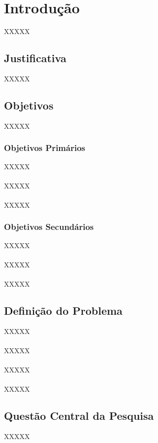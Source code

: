 \chapter{Introdução}
\label{Cap:Intro}


XXXXX

\section{Justificativa}

XXXXX

\section{Objetivos}

XXXXX

\subsection{Objetivos Primários}

XXXXX
\\\\
XXXXX
\\\\
XXXXX

\subsection{Objetivos Secundários}

XXXXX
\\\\
XXXXX
\\\\
XXXXX

\section{Definição do Problema}
XXXXX
\\\\
XXXXX
\\\\
XXXXX
\\\\
XXXXX

\section{Questão Central da Pesquisa}

XXXXX

